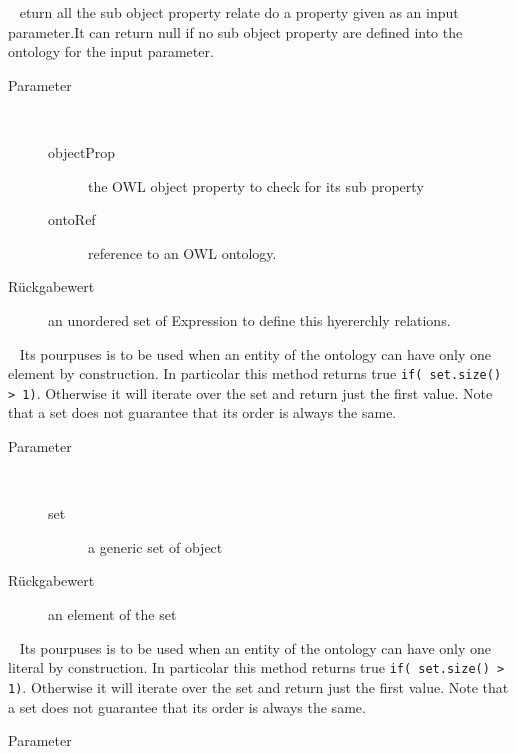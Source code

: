 \begin{description}
~ eturn all the sub object property relate do a property
 given as an input parameter.It can return null if no sub object property
 are defined into the ontology for the input parameter.
\begin{description}
\item[Parameter] ~
\begin{description}
\item[objectProp]
the OWL object property to check for its sub property
\item[ontoRef]
reference to an OWL ontology.
\end{description}
\item[Rückgabewert] 
an unordered set of Expression to define this hyererchly relations.
\end{description}
\item[{\ltdHypertarget{ontologyFramework.OFContextManagement.OWLLibrary.getOnlyElement(java.util.Set<?>)}{getOnlyElement}\label{ontologyFramework.OFContextManagement.OWLLibrary.getOnlyElement(java.util.Set<?>)}}]
~ Its pourpuses is to be used when an entity of the ontology can
 have only one element by construction. In particolar this method
 returns true \verb!if( set.size() > 1)!. Otherwise it will iterate over 
 the set and return just the first value. Note that a set does not
 guarantee that its order is always the same.
\begin{description}
\item[Parameter] ~
\begin{description}
\item[set]
a generic set of object
\end{description}
\item[Rückgabewert] 
an element of the set
\end{description}
\item[{\ltdHypertarget{ontologyFramework.OFContextManagement.OWLLibrary.getOnlyString(java.util.Set<org.semanticweb.owlapi.model.OWLLiteral>)}{getOnlyString}\label{ontologyFramework.OFContextManagement.OWLLibrary.getOnlyString(java.util.Set<org.semanticweb.owlapi.model.OWLLiteral>)}}]
~ Its pourpuses is to be used when an entity of the ontology can
 have only one literal by construction. In particolar this method
 returns true \verb!if( set.size() > 1)!. Otherwise it will iterate over 
 the set and return just the first value. Note that a set does not
 guarantee that its order is always the same.
\begin{description}
\item[Parameter] ~
\begin{description}

\end{description}
\end{description}
\end{description}
